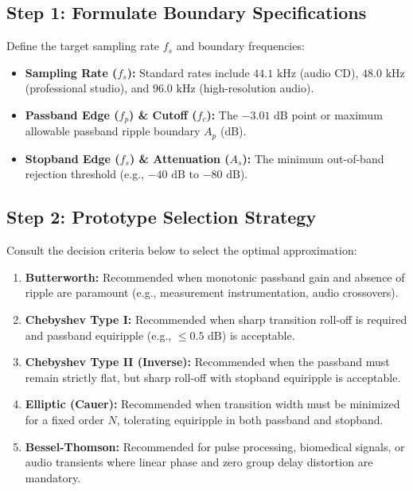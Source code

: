 \documentclass[11pt,a4paper]{article}
\begin{document}
\subsection*{Step 1: Formulate Boundary Specifications}
Define the target sampling rate $f_s$ and boundary frequencies:
\begin{itemize}[leftmargin=20pt,itemsep=2pt]
\item \textbf{Sampling Rate ($f_s$):} Standard rates include $44.1\text{ kHz}$ (audio CD), $48.0\text{ kHz}$ (professional studio), and $96.0\text{ kHz}$ (high-resolution audio).
\item \textbf{Passband Edge ($f_p$) \& Cutoff ($f_c$):} The $-3.01\text{ dB}$ point or maximum allowable passband ripple boundary $A_p$ (dB).
\item \textbf{Stopband Edge ($f_s$) \& Attenuation ($A_s$):} The minimum out-of-band rejection threshold (e.g., $-40\text{ dB}$ to $-80\text{ dB}$).
\end{itemize}

\subsection*{Step 2: Prototype Selection Strategy}
Consult the decision criteria below to select the optimal approximation:
\begin{enumerate}[leftmargin=20pt,itemsep=2pt]
\item \textbf{Butterworth:} Recommended when monotonic passband gain and absence of ripple are paramount (e.g., measurement instrumentation, audio crossovers).
\item \textbf{Chebyshev Type I:} Recommended when sharp transition roll-off is required and passband equiripple (e.g., $\le 0.5\text{ dB}$) is acceptable.
\item \textbf{Chebyshev Type II (Inverse):} Recommended when the passband must remain strictly flat, but sharp roll-off with stopband equiripple is acceptable.
\item \textbf{Elliptic (Cauer):} Recommended when transition width must be minimized for a fixed order $N$, tolerating equiripple in both passband and stopband.
\item \textbf{Bessel-Thomson:} Recommended for pulse processing, biomedical signals, or audio transients where linear phase and zero group delay distortion are mandatory.
\end{enumerate}
\end{document}
